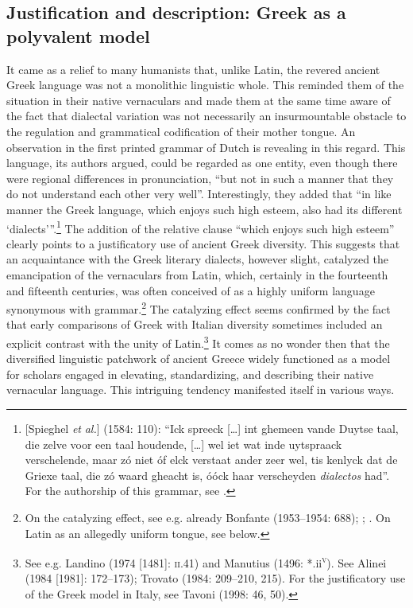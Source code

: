 \subsection{Justification and description: Greek as a polyvalent model}

It came as a relief to many humanists that, unlike Latin, the revered ancient Greek language was not a monolithic linguistic whole. This reminded them of the situation in their native vernaculars and made them at the same time aware of the fact that dialectal variation was not necessarily an insurmountable obstacle to the regulation and grammatical codification of their mother tongue. An observation in the first printed grammar of Dutch is revealing in this regard. This language, its authors argued, could be regarded as one entity, even though there were regional differences in pronunciation, “but not in such a manner that they do not understand each other very well”. Interestingly, they added that “in like manner the Greek language, which enjoys such high esteem, also had its different ‘dialects’”.\footnote{[Spieghel \textit{et} \textit{al.}] (1584: 110): “Ick spreeck […] int ghemeen vande Duytse taal, die zelve voor een taal houdende, […] wel iet wat inde uytspraack verschelende, maar zó niet óf elck verstaat ander zeer wel, tis kenlyck dat de Griexe taal, die zó waard gheacht is, óóck haar verscheyden \textit{dialectos} had”. For the authorship of this grammar, see \citet{Peeters1982}.} The addition of the relative clause “which enjoys such high esteem” clearly points to a justificatory use of ancient Greek diversity. This suggests that an acquaintance with the Greek literary dialects, however slight, catalyzed the emancipation of the vernaculars from Latin, which, certainly in the fourteenth and fifteenth centuries, was often conceived of as a highly uniform language synonymous with grammar.\footnote{On the catalyzing effect, see e.g. already Bonfante (1953–1954: 688); \citet[9]{Trapp1990}; \citet[67]{Rhodes2015}. On Latin as an allegedly uniform tongue, see  below.} The catalyzing effect seems confirmed by the fact that early comparisons of Greek with Italian diversity sometimes included an explicit contrast with the unity of Latin.\footnote{See e.g. Landino (1974 [1481]: \textsc{ii}.41) and Manutius (1496: *.ii\textsc{\textsuperscript{v}}). See Alinei (1984 [1981]: 172–173); Trovato (1984: 209–210, 215). For the justificatory use of the Greek model in Italy, see Tavoni (1998: 46, 50).} It comes as no wonder then that the diversified linguistic patchwork of ancient Greece widely functioned as a model for scholars engaged in elevating, standardizing, and describing their native vernacular language. This intriguing tendency manifested itself in various ways.

